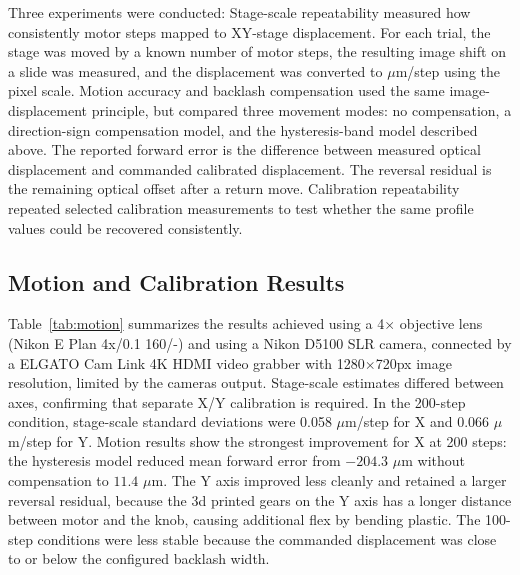 \documentclass[runningheads]{llncs}
\begin{document}
Three experiments were conducted: Stage-scale repeatability measured how consistently motor steps mapped to XY-stage displacement. For each trial, the stage was moved by a known number of motor steps, the resulting image shift on a slide was measured, and the displacement was converted to $\mu$m/step using the pixel scale. Motion accuracy and backlash compensation used the same image-displacement principle, but compared three movement modes: no compensation, a direction-sign compensation model, and the hysteresis-band model described above. The reported forward error is the difference between measured optical displacement and commanded calibrated displacement. The reversal residual is the remaining optical offset after a return move. Calibration repeatability repeated selected calibration measurements to test whether the same profile values could be recovered consistently.

\subsection{Motion and Calibration Results}

Table~\ref{tab:motion} summarizes the results achieved using a 4$\times$ objective lens (Nikon E Plan 4x/0.1 160/-) and using a Nikon D5100 SLR camera, connected by a ELGATO Cam Link 4K HDMI video grabber with 1280$\times$720px image resolution, limited by the cameras output. Stage-scale estimates differed between axes, confirming that separate X/Y calibration is required. In the 200-step condition, stage-scale standard deviations were 0.058 $\mu$m/step for X and 0.066 $\mu$m/step for Y. Motion results show the strongest improvement for X at 200 steps: the hysteresis model reduced mean forward error from $-204.3$ $\mu$m without compensation to $11.4$ $\mu$m. The Y axis improved less cleanly and retained a larger reversal residual, because the 3d printed gears on the Y axis has a longer distance between motor and the knob, causing additional flex by bending plastic. The 100-step conditions were less stable because the commanded displacement was close to or below the configured backlash width.
\end{document}
